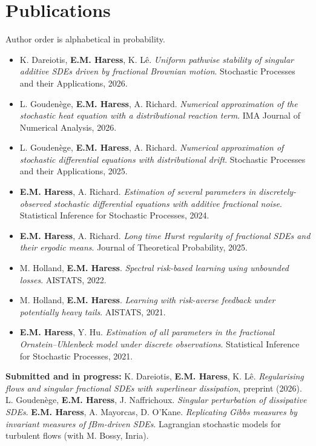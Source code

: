 \documentclass[10pt,a4paper]{article}
\begin{document}
\section{Publications}
{\scriptsize\color{muted}Author order is alphabetical in probability.\par}
\vspace{0.22ex}
\begin{itemize}[leftmargin=1.15em, itemsep=0.10ex, topsep=0pt, parsep=0pt, label={\textcolor{accent}{\scriptsize$\blacktriangleright$}}]
  \scriptsize
  \item K. Dareiotis, \textbf{E.M. Haress}, K. Lê. \emph{Uniform pathwise stability of singular additive SDEs
  driven by fractional Brownian motion}. Stochastic Processes and their Applications, 2026.
  \item L. Goudenège, \textbf{E.M. Haress}, A. Richard. \emph{Numerical approximation of the stochastic heat
  equation with a distributional reaction term}. IMA Journal of Numerical Analysis, 2026.
  \item L. Goudenège, \textbf{E.M. Haress}, A. Richard. \emph{Numerical approximation of stochastic differential
  equations with distributional drift}. Stochastic Processes and their Applications, 2025.
  \item \textbf{E.M. Haress}, A. Richard. \emph{Estimation of several parameters in discretely-observed stochastic
  differential equations with additive fractional noise}. Statistical Inference for Stochastic Processes, 2024.
  \item \textbf{E.M. Haress}, A. Richard. \emph{Long time Hurst regularity of fractional SDEs and their ergodic
  means}. Journal of Theoretical Probability, 2025.
  \item M. Holland, \textbf{E.M. Haress}. \emph{Spectral risk-based learning using unbounded losses}. AISTATS, 2022.
  \item M. Holland, \textbf{E.M. Haress}. \emph{Learning with risk-averse feedback under potentially heavy tails}. AISTATS, 2021.
  \item \textbf{E.M. Haress}, Y. Hu. \emph{Estimation of all parameters in the fractional Ornstein--Uhlenbeck model
  under discrete observations}. Statistical Inference for Stochastic Processes, 2021.
\end{itemize}
\vspace{0.3ex}
{\scriptsize\textbf{Submitted and in progress:} K. Dareiotis, \textbf{E.M. Haress}, K. Lê. \emph{Regularising flows and
singular fractional SDEs with superlinear dissipation}, preprint (2026). \textbullet{} L. Goudenège, \textbf{E.M. Haress},
J. Naffrichoux. \emph{Singular perturbation of dissipative SDEs}. \textbullet{} \textbf{E.M. Haress}, A. Mayorcas, D. O'Kane.
\emph{Replicating Gibbs measures by invariant measures of fBm-driven SDEs}. \textbullet{} Lagrangian stochastic models for
turbulent flows (with M. Bossy, Inria).\par}
\end{document}
